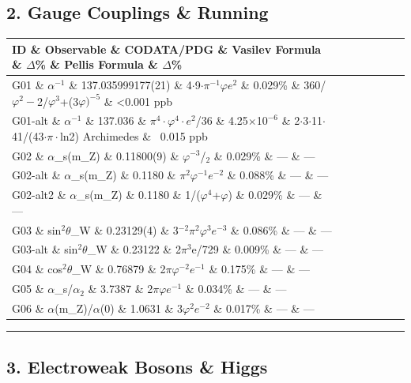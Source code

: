 \subsection{2. Gauge Couplings \& Running}

\begin{tabular}{|l|l|l|l|l|l|l|}
\hline
ID \& Observable \& CODATA/PDG \& Vasilev Formula \& $\Delta$\% \& Pellis Formula \& $\Delta$\% \\
\hline
G01 \& $\alpha^{-1}$ \& 137.035999177(21) \& 4$\cdot$9$\cdot\pi^{-1}\varphi$$e^{2}$ \& 0.029\% \& 360/$\varphi^{2}-$2/$\varphi^{3}$+(3$\varphi$$)^{-5}$ \& <0.001 ppb \\
G01-alt \& $\alpha^{-1}$ \& 137.036 \& $\pi^{4}\cdot\varphi^{4}\cdot$$e^{2}$/36 \& 4.25$\times$1$0^{-6}$ \& 2$\cdot$3$\cdot$11$\cdot$41/(43$\cdot\pi\cdot$ln2) Archimedes \& ~0.015 ppb \\
G02 \& $\alpha$\_s(m\_Z) \& 0.11800(9) \& $\varphi^{-3}$/$_{2}$ \& 0.029\% \& --- \& --- \\
G02-alt \& $\alpha$\_s(m\_Z) \& 0.1180 \& $\pi^{2}\varphi^{-1}$$e^{-2}$ \& 0.088\% \& --- \& --- \\
G02-alt2 \& $\alpha$\_s(m\_Z) \& 0.1180 \& 1/($\varphi^{4}$+$\varphi$) \& 0.029\% \& --- \& --- \\
G03 \& sin$^{2}\theta$\_W \& 0.23129(4) \& 3$^{-2}\pi^{2}\varphi^{3}$$e^{-3}$ \& 0.086\% \& --- \& --- \\
G03-alt \& sin$^{2}\theta$\_W \& 0.23122 \& 2$\pi^{3}$e/729 \& 0.009\% \& --- \& --- \\
G04 \& cos$^{2}\theta$\_W \& 0.76879 \& 2$\pi\varphi^{-2}$$e^{-1}$ \& 0.175\% \& --- \& --- \\
G05 \& $\alpha$\_s/$\alpha_{2}$ \& 3.7387 \& 2$\pi\varphi$$e^{-1}$ \& 0.034\% \& --- \& --- \\
G06 \& $\alpha$(m\_Z)/$\alpha$(0) \& 1.0631 \& 3$\varphi^{2}$$e^{-2}$ \& 0.017\% \& --- \& --- \\
\hline
\end{tabular}
\noindent\rule{\textwidth}{0.4pt}

\subsection{3. Electroweak Bosons \& Higgs}

